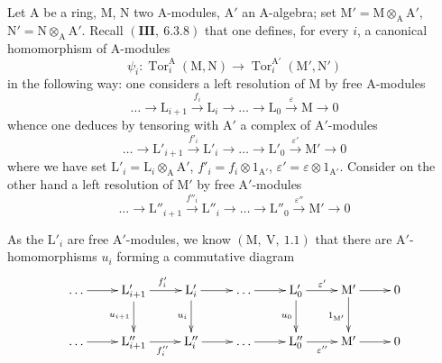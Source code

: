 \begin{env}[11.2.1]
\label{IV.11.2.1}
Let $\mathrm{A}$ be a ring, $\mathrm{M}$, $\mathrm{N}$ two A-modules, $\mathrm{A}'$ an A-algebra; set $\mathrm{M}'=\mathrm{M}\otimes_\mathrm{A}\mathrm{A}'$, $\mathrm{N}'=\mathrm{N}\otimes_\mathrm{A}\mathrm{A}'$. Recall $(\textbf{III},~6.3.8)$ that one defines, for every $i$, a canonical homomorphism of A-modules
\begin{equation}
  \psi_i:\operatorname{Tor}_i^\mathrm{A}(\mathrm{M},\mathrm{N})\to\operatorname{Tor}_i^{\mathrm{A}'}(\mathrm{M}',\mathrm{N}')
  \label{IV.11.2.1.1}
\tag{11.2.1.1}
\end{equation}
in the following way: one considers a left resolution of $\mathrm{M}$ by free A-modules
\begin{equation}
  \ldots\longrightarrow\mathrm{L}_{i+1}\xrightarrow{f_i}\mathrm{L}_i\longrightarrow\ldots\longrightarrow\mathrm{L}_0\xrightarrow{\varepsilon}\mathrm{M}\longrightarrow 0
  \label{IV.11.2.1.2}
\tag{11.2.1.2}
\end{equation}
whence one deduces by tensoring with $\mathrm{A}'$ a complex of $\mathrm{A}'$-modules
\begin{equation}
  \ldots\longrightarrow\mathrm{L}'_{i+1}\xrightarrow{f'_i}\mathrm{L}'_i\longrightarrow\ldots\longrightarrow\mathrm{L}'_0\xrightarrow{\varepsilon'}\mathrm{M}'\longrightarrow 0
  \label{IV.11.2.1.3}
\tag{11.2.1.3}
\end{equation}
where we have set $\mathrm{L}'_i=\mathrm{L}_i\otimes_\mathrm{A}\mathrm{A}'$, $f'_i=f_i\otimes 1_{\mathrm{A}'}$, $\varepsilon'=\varepsilon\otimes 1_{\mathrm{A}'}$. Consider on the other hand a left resolution of $\mathrm{M}'$ by free $\mathrm{A}'$-modules
\begin{equation}
  \ldots\longrightarrow\mathrm{L}''_{i+1}\xrightarrow{f''_i}\mathrm{L}''_i\longrightarrow\ldots\longrightarrow\mathrm{L}''_0\xrightarrow{\varepsilon''}\mathrm{M}'\longrightarrow 0
  \label{IV.11.2.1.4}
\tag{11.2.1.4}
\end{equation}
\end{env}


As the $\mathrm{L}'_i$ are free $\mathrm{A}'$-modules, we know $(\mathrm{M},~\mathrm{V},~1.1)$ that there are $\mathrm{A}'$-homomorphisms $u_i$ forming a commutative diagram
\[
\xymatrix{
  \ldots \ar[r] & \mathrm{L}'_{i+1} \ar[r]^{f'_i} \ar[d]_{u_{i+1}} & \mathrm{L}'_i \ar[r] \ar[d]_{u_i} & \ldots \ar[r] & \mathrm{L}'_0 \ar[r]^{\varepsilon'} \ar[d]_{u_0} & \mathrm{M}' \ar[r] \ar[d]_{1_{\mathrm{M}'}} & 0 \\
  \ldots \ar[r] & \mathrm{L}''_{i+1} \ar[r]_{f''_i} & \mathrm{L}''_i \ar[r] & \ldots \ar[r] & \mathrm{L}''_0 \ar[r]_{\varepsilon''} & \mathrm{M}' \ar[r] & 0
}
\]

